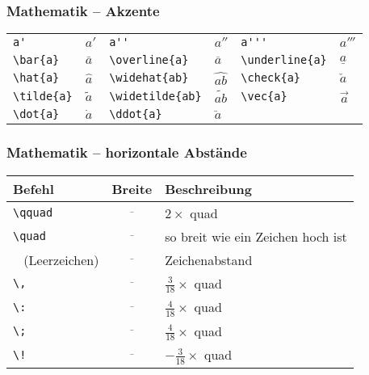 \begin{frame}[fragile]
	\frametitle{Mathematik -- Akzente}
	\begin{center}
		\begin{tabular}{ll|ll|ll}
			\verb|a'| & $a'$ &
			\verb|a''| & $a''$ &
			\verb|a'''| & $a'''$ \\
			\verb|\bar{a}| & $\bar{a}$ &
			\verb|\overline{a}| & $\overline{a}$ &
			\verb|\underline{a}| & $\underline{a}$ \\
			\verb|\hat{a}| & $\hat{a}$ &
			\verb|\widehat{ab}| & $\widehat{ab}$ &
			\verb|\check{a}| & $\check{a}$ \\
			\verb|\tilde{a}| & $\tilde{a}$ &
			\verb|\widetilde{ab}| & $\widetilde{ab}$ &
			\verb|\vec{a}| & $\vec{a}$ \\
			\verb|\dot{a}| & $\dot{a}$ &
			\verb|\ddot{a}| & $\ddot{a}$
		\end{tabular}
	\end{center}
\end{frame}

\begin{frame}[fragile]
	\frametitle{Mathematik -- horizontale Abstände}
	\begin{center}
		\begin{tabular}{l|c|l}
		Befehl & Breite & Beschreibung\\ \hline
			\verb|\qquad| & $\overline{\qquad}$ & $2\times$ quad \\
			\verb|\quad| & $\overline{\quad}$ & so breit wie ein Zeichen hoch ist \\
			\textvisiblespace~ (Leerzeichen)          & $\overline{~}$ & Zeichenabstand \\
			\verb|\,| & $\overline{\,}$ & $\frac{3}{18} \times$ quad \\
			\verb|\:| & $\overline{\:}$ & $\frac{4}{18} \times$ quad \\
			\verb|\;| & $\overline{\;}$ & $\frac{4}{18} \times$ quad \\
			\verb|\!| & $\overline{\,}$ & $-\frac{3}{18} \times$ quad \\
		\end{tabular}
	\end{center}
	\vfill
\end{frame}
